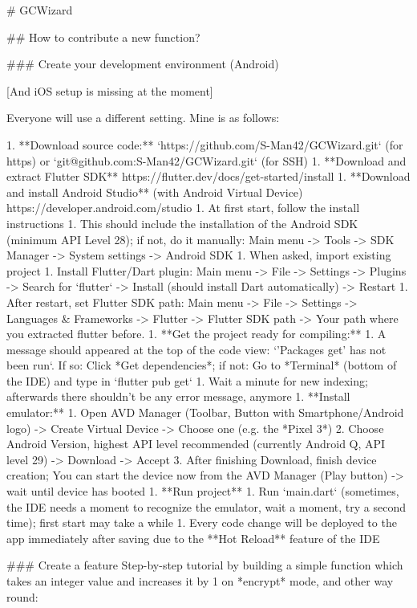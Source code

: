 # GCWizard

## How to contribute a new function?

### Create your development environment (Android)

[And iOS setup is missing at the moment]

Everyone will use a different setting. Mine is as follows:

1. **Download source code:** `https://github.com/S-Man42/GCWizard.git` (for https) or `git@github.com:S-Man42/GCWizard.git` (for SSH)
1. **Download and extract Flutter SDK** https://flutter.dev/docs/get-started/install
1. **Download and install Android Studio** (with Android Virtual Device) https://developer.android.com/studio
   1. At first start, follow the install instructions
      1. This should include the installation of the Android SDK (minimum API Level 28); if not, do it manually: Main menu -> Tools -> SDK Manager -> System settings -> Android SDK
   1. When asked, import existing project
   1. Install Flutter/Dart plugin: Main menu -> File -> Settings -> Plugins -> Search for `flutter` -> Install (should install Dart automatically) -> Restart
   1. After restart, set Flutter SDK path: Main menu -> File -> Settings -> Languages & Frameworks -> Flutter -> Flutter SDK path -> Your path where you extracted flutter before.
1. **Get the project ready for compiling:**
   1. A message should appeared at the top of the code view: `'Packages get' has not been run`. If so: Click *Get dependencies*; if not: Go to *Terminal* (bottom of the IDE) and type in `flutter pub get`
   1. Wait a minute for new indexing; afterwards there shouldn't be any error message, anymore
1. **Install emulator:**
   1. Open AVD Manager (Toolbar, Button with Smartphone/Android logo) -> Create Virtual Device -> Choose one (e.g. the *Pixel 3*) 
   2. Choose Android Version, highest API level recommended (currently Android Q, API level 29) -> Download -> Accept
   3. After finishing Download, finish device creation; You can start the device now from the AVD Manager (Play button) -> wait until device has booted
1. **Run project**
   1. Run `main.dart` (sometimes, the IDE needs a moment to recognize the emulator, wait a moment, try a second time); first start may take a while
   1. Every code change will be deployed to the app immediately after saving due to the **Hot Reload** feature of the IDE
 
### Create a feature
Step-by-step tutorial by building a simple function which takes an integer value and increases it by 1 on *encrypt* mode, and other way round:

